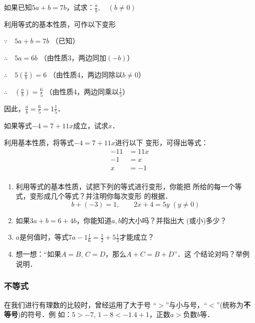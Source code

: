 \begin{example}
如果已知$5a + b = 7b$，试求：$\frac{a}{b},\quad (b\ne 0)$
\end{example}

\begin{solution}
    利用等式的基本性质，可作以下变形

    $\because\quad 5a+b=7b$ （已知）

    $\therefore\quad 5a=6b$ （由性质3，两边同加$(-b)$）

    $\therefore\quad 5\left(\frac{a}{b}\right)=6$ （由性质4，两边同除以$b\ne 0$）

    $\therefore\quad \left(\frac{a}{b}\right)=\frac{6}{5}$ （由性质4，两边同乘以$\frac{1}{5}$）

    因此，$\frac{a}{b}=\frac{6}{5}=1\frac{1}{5}$．
\end{solution}

\begin{example}
    如果等式$-4=7+11x$成立，试求$x$．
\end{example}

\begin{solution}
    利用基本性质，将等式$-4=7+11x$进行以下
变形，可得出等式：
\begin{align*}
    -11&=11x  \tag{两边同减去7}\\
    -1&=x  \tag{两边同除以11}\\
    x&=-1  \tag{两边对调位置}\\
\end{align*}
\end{solution}

\begin{ex}
 \begin{enumerate}
     \item 利用等式的基本性质，试把下列的等式进行变形，你能把
     所给的每一个等式，变形成几个等式？并注明你每次变形
     的根据．
    \[b+(-3)=1,\qquad 2x+4=5y\; (y\ne 0) \]
     \item 如果$3a+b=6+4b$，你能知道$a,b$的大小吗？并指出大
       (或小)多少？
      \item $a$是何值时，等式$7a-1\frac{1}{6}=\frac{1}{2}+5\frac{1}{3}$才能成立？

   \item 想一想：“如果$A=B$, $C=D$，那么$A+C=B+D$”．这
     个结论对吗？举例说明．
 \end{enumerate}   
\end{ex}

\subsubsection{不等式}
在我们进行有理数的比较时，曾经运用了大于号
“$>$”与小与号，“$<$”(统称为\textbf{不等号})的符号．例
如：$5>-7$,  $1-8<-1.4+1$，正数$a>$负数$b$等．

